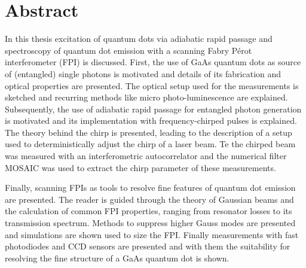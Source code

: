 

\chapter*{Abstract}
\label{cha:abstract}


In this thesis excitation of quantum dots via adiabatic rapid passage and spectroscopy of quantum dot emission with a scanning Fabry Pérot interferometer (FPI) is discussed.
First, the use of GaAs quantum dots as source of (entangled) single photons is motivated and details of its fabrication and optical properties are presented.
The optical setup used for the measurements is sketched and recurring methods like micro photo-luminescence are explained.
Subsequently, the use of adiabatic rapid passage for entangled photon generation is motivated and its implementation with frequency-chirped pulses is explained.
The theory behind the chirp is presented, leading to the description of a setup used to deterministically adjust the chirp of a laser beam.
Te the chirped beam was measured with an interferometric autocorrelator and the numerical filter MOSAIC was used to extract the chirp parameter of these measurements.

Finally, scanning FPIs as tools to resolve fine features of quantum dot emission are presented.
The reader is guided through the theory of Gaussian beams and the calculation of common FPI properties, ranging from resonator losses to its transmission spectrum.
Methods to suppress higher Gauss modes are presented and simulations are shown used to size the FPI.
Finally measurements with fast photodiodes and CCD sensors are presented and with them the suitability for resolving the fine structure of a GaAs quantum dot is shown.   


